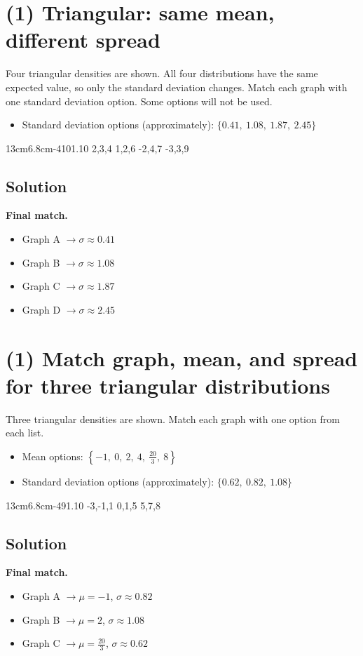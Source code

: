 \section{(1) Triangular: same mean, different spread}
Four triangular densities are shown. All four distributions have the same expected value, so only the standard deviation changes.
Match each graph with one standard deviation option. Some options will not be used.
\begin{itemize}
\item Standard deviation options (approximately): $\{0.41,\ 1.08,\ 1.87,\ 2.45\}$
\end{itemize}
\TriangularFourGraph
{13cm}{6.8cm}{-4}{10}{1.10}
{2,3,4}
{1,2,6}
{-2,4,7}
{-3,3,9}

\subsection*{Solution}
\textbf{Final match.}
\begin{itemize}
\item Graph A $\to \sigma\approx0.41$
\item Graph B $\to \sigma\approx1.08$
\item Graph C $\to \sigma\approx1.87$
\item Graph D $\to \sigma\approx2.45$
\end{itemize}

\section{(1) Match graph, mean, and spread for three triangular distributions}
Three triangular densities are shown.
Match each graph with one option from each list.
\begin{itemize}
\item Mean options: $\left\{-1,\ 0,\ 2,\ 4,\ \frac{20}{3},\ 8\right\}$
\item Standard deviation options (approximately): $\{0.62,\ 0.82,\ 1.08\}$
\end{itemize}
\TriangularThreeGraph
{13cm}{6.8cm}{-4}{9}{1.10}
{-3,-1,1}
{0,1,5}
{5,7,8}

\subsection*{Solution}
\textbf{Final match.}
\begin{itemize}
\item Graph A $\to \mu=-1$, $\sigma\approx0.82$
\item Graph B $\to \mu=2$, $\sigma\approx1.08$
\item Graph C $\to \mu=\frac{20}{3}$, $\sigma\approx0.62$
\end{itemize}

